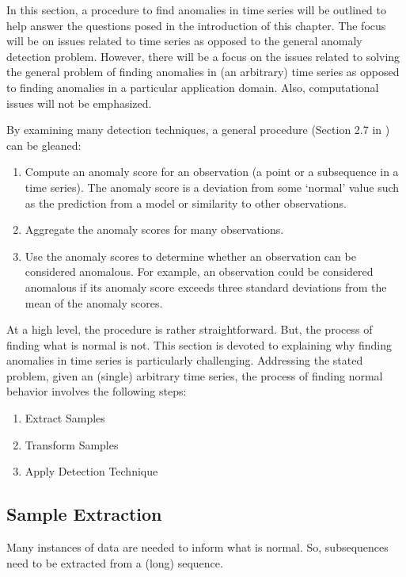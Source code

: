 In this section, a procedure to find anomalies in time series will be outlined to help answer the questions posed in the introduction of this chapter. The focus will be on issues related to time series as opposed to the general anomaly detection problem. However, there will be a focus on the issues related to solving the general problem of finding anomalies in (an arbitrary) time series as opposed to finding anomalies in a particular application domain. Also, computational issues will not be emphasized.

By examining many detection techniques, a general procedure (Section 2.7 in \cite{Cheboli2010}) can be gleaned:

\begin{enumerate}
\item Compute an anomaly score for an observation (a point or a subsequence in a time series). The anomaly score is a deviation from some `normal' value such as the prediction from a model or similarity to other observations.
\item Aggregate the anomaly scores for many observations.
\item Use the anomaly scores to determine whether an observation can be considered anomalous. For example, an observation could be considered anomalous if its anomaly score exceeds three standard deviations from the mean of the anomaly scores.
\end{enumerate}

At a high level, the procedure is rather straightforward. But, the process of finding what is normal is not. This section is devoted to explaining why finding anomalies in time series is particularly challenging. Addressing the stated problem, given an (single) arbitrary time series, the process of finding normal behavior involves the following steps:
\begin{enumerate}
\item Extract Samples
\item Transform Samples
\item Apply Detection Technique
\end{enumerate}

\subsection{Sample Extraction}
\label{sec:adsample}

Many instances of data are needed to inform what is normal. So, subsequences need to be extracted from a (long) sequence.

